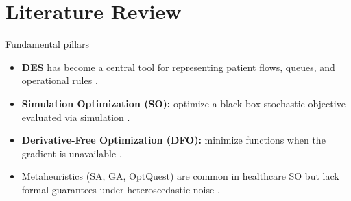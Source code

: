 \documentclass[xcolor=svgnames]{beamer}
\begin{document}
\section{Literature Review}
\begin{frame}{Fundamental pillars}
	\begin{itemize}[<+->]
		\item \textbf{DES} has become a central tool for representing patient flows, queues, and operational rules \citep{MonksHarper2025}.
		\item \textbf{Simulation Optimization (SO):} optimize a black-box stochastic objective evaluated via simulation \citep{Amaran2016}.
		\item \textbf{Derivative-Free Optimization (DFO):} minimize functions when the gradient is unavailable \citep{Conn2009}.
		\item Metaheuristics (SA, GA, OptQuest) are common in healthcare SO but lack formal guarantees under heteroscedastic noise \citep{Wang2023,Nazri2025}.
	\end{itemize}
\end{frame}
\end{document}
